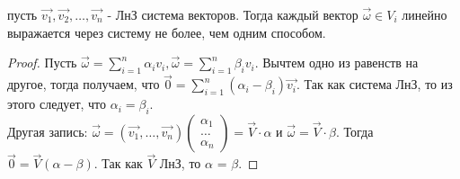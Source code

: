 \begin{proposition}
пусть \(\vec{v_1}, \vec{v_2}, \ldots, \vec{v_n}\) - ЛнЗ система векторов. Тогда каждый вектор \(\vec{\omega}\in V_i\) линейно выражается через систему не более, чем одним способом.
\end{proposition}
\begin{proof}
Пусть \(\vec{\omega} = \sum_{i=1}^{n}\alpha_iv_i, \vec{\omega} = \sum_{i=1}^{n}\beta_iv_i\). Вычтем одно из равенств на другое, тогда получаем, что \(\vec{0} = \sum_{i=1}^{n}(\alpha_i-\beta_i)\vec{v_i}\). Так как система ЛнЗ, то из этого следует, что \(\alpha_i = \beta_i\). \\
Другая запись: $\vec{\omega} = (\vec{v_1}, \ldots, \vec{v_n})\begin{pmatrix}
		\alpha_1 \\ \ldots \\ \alpha_n
	\end{pmatrix} = \vec{V}\cdot\alpha$ и $\vec{\omega} =\vec{V}\cdot\beta$. Тогда $\vec{0} = \vec{V}(\alpha-\beta)$. Так как $\vec{V}$ ЛнЗ, то $\alpha$ = $\beta$.
\end{proof}
